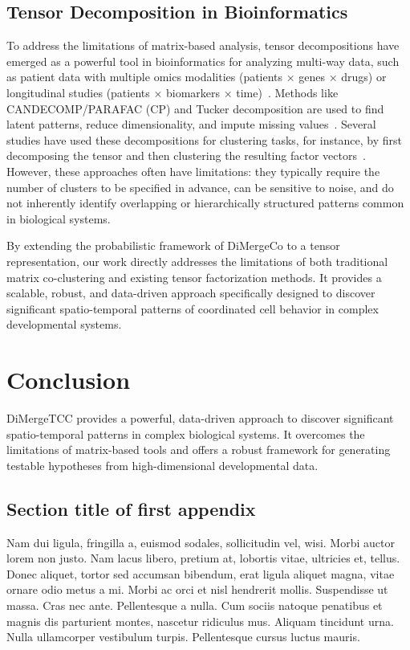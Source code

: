 \documentclass[unnumsec,webpdf,modern,large,namedate]{oup-authoring-template}%
\theoremstyle{thmstyleone}%
\theoremstyle{thmstyletwo}%
\theoremstyle{thmstylethree}%
\begin{document}
\subsection{Tensor Decomposition in Bioinformatics}
To address the limitations of matrix-based analysis, tensor decompositions have emerged as a powerful tool in bioinformatics for analyzing multi-way data, such as patient data with multiple omics modalities (patients × genes × drugs) or longitudinal studies (patients × biomarkers × time)~\citep{kolda2009TensorDecompositionsApplications}. Methods like CANDECOMP/PARAFAC (CP) and Tucker decomposition are used to find latent patterns, reduce dimensionality, and impute missing values~\citep{yu2025OptimizationMethodsTensor}. Several studies have used these decompositions for clustering tasks, for instance, by first decomposing the tensor and then clustering the resulting factor vectors~\citep{cheng2019TensorBasedLowDimensionalRepresentation}. However, these approaches often have limitations: they typically require the number of clusters to be specified in advance, can be sensitive to noise, and do not inherently identify overlapping or hierarchically structured patterns common in biological systems.

By extending the probabilistic framework of DiMergeCo to a tensor representation, our work directly addresses the limitations of both traditional matrix co-clustering and existing tensor factorization methods. It provides a scalable, robust, and data-driven approach specifically designed to discover significant spatio-temporal patterns of coordinated cell behavior in complex developmental systems.

\section{Conclusion}
DiMergeTCC provides a powerful, data-driven approach to discover significant spatio-temporal patterns in complex biological systems. It overcomes the limitations of matrix-based tools and offers a robust framework for generating testable hypotheses from high-dimensional developmental data.


\begin{appendices}

\section{Section title of first appendix}\label{sec11}

Nam dui ligula, fringilla a, euismod sodales, sollicitudin vel, wisi. Morbi auctor lorem non justo. Nam lacus libero,
pretium at, lobortis vitae, ultricies et, tellus. Donec aliquet, tortor sed accumsan bibendum, erat ligula aliquet magna,
vitae ornare odio metus a mi. Morbi ac orci et nisl hendrerit mollis. Suspendisse ut massa. Cras nec ante. Pellentesque
a nulla. Cum sociis natoque penatibus et magnis dis parturient montes, nascetur ridiculus mus. Aliquam tincidunt
urna. Nulla ullamcorper vestibulum turpis. Pellentesque cursus luctus mauris.

\end{appendices}
\end{document}
